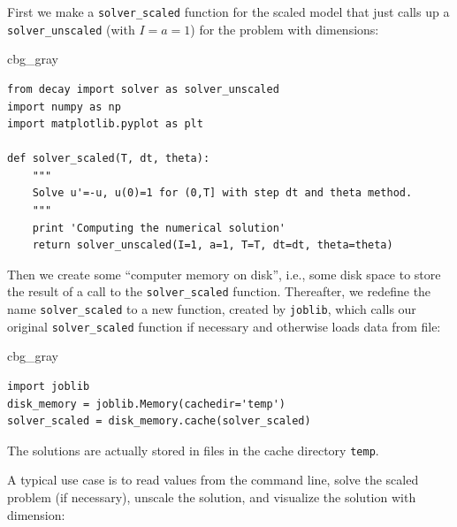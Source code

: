 \documentclass[graybox,envcountchap,sectrefs,final]{svmonodo}
\newenvironment{_cod_tight}[1]{
   \def\FrameCommand{\colorbox{#1}}
   \FrameRule0.6pt\MakeFramed {\FrameRestore}\vskip3mm}
   {\vskip0mm\endMakeFramed}
\newenvironment{cod}[1]{
\bgroup\rmfamily
\fboxsep=0mm\relax
\begin{_cod_tight}{#1}
\list{}{\parsep=-2mm\parskip=0mm\topsep=0pt\leftmargin=2mm
\rightmargin=2\leftmargin\leftmargin=4pt\relax}
\item\relax}
{\endlist\end{_cod_tight}\egroup}
\begin{document}
First we make a \Verb!solver_scaled! function for the scaled
model that just calls up a \Verb!solver_unscaled! (with $I=a=1$) for the problem with
dimensions:

\begin{cod}{cbg_gray}\begin{Verbatim}[numbers=none,fontsize=\fontsize{9pt}{9pt},baselinestretch=0.95,xleftmargin=2mm]
from decay import solver as solver_unscaled
import numpy as np
import matplotlib.pyplot as plt

def solver_scaled(T, dt, theta):
    """
    Solve u'=-u, u(0)=1 for (0,T] with step dt and theta method.
    """
    print 'Computing the numerical solution'
    return solver_unscaled(I=1, a=1, T=T, dt=dt, theta=theta)
\end{Verbatim}
\end{cod}
\noindent
Then we create some ``computer memory on disk'', i.e., some disk space to
store the result of a call to the \Verb!solver_scaled! function. Thereafter,
we redefine the name \Verb!solver_scaled! to a new function, created
by \texttt{joblib}, which calls our original \Verb!solver_scaled! function
if necessary and otherwise loads data from file:

\begin{cod}{cbg_gray}\begin{Verbatim}[numbers=none,fontsize=\fontsize{9pt}{9pt},baselinestretch=0.95,xleftmargin=2mm]
import joblib
disk_memory = joblib.Memory(cachedir='temp')
solver_scaled = disk_memory.cache(solver_scaled)
\end{Verbatim}
\end{cod}
\noindent
The solutions are actually stored in files in the cache directory \texttt{temp}.

A typical use case is to read values from the command line,
solve the scaled problem (if necessary), unscale the solution, and visualize
the solution with dimension:
\end{document}
